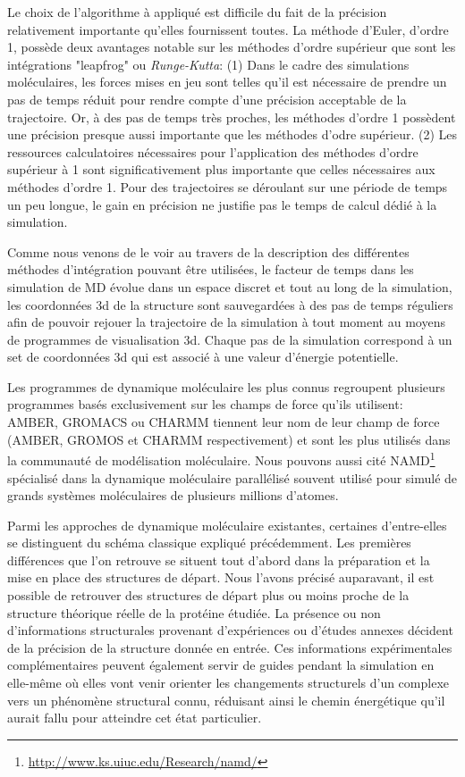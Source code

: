 Le choix de l'algorithme à appliqué est difficile du fait de la précision relativement importante qu'elles fournissent toutes. La méthode d'Euler, d'ordre 1, possède deux avantages notable sur les méthodes d'ordre supérieur que sont les intégrations "leapfrog" ou \textit{Runge-Kutta}: (1) Dans le cadre des simulations moléculaires, les forces mises en jeu sont telles qu'il est nécessaire de prendre un pas de temps réduit pour rendre compte d'une précision acceptable de la trajectoire. Or, à des pas de temps très proches, les méthodes d'ordre 1 possèdent une précision presque aussi importante que les méthodes d'odre supérieur. (2) Les ressources calculatoires nécessaires pour l'application des méthodes d'ordre supérieur à 1 sont significativement plus importante que celles nécessaires aux méthodes d'ordre 1. Pour des trajectoires se déroulant sur une période de temps un peu longue, le gain en précision ne justifie pas le temps de calcul dédié à la simulation.  

Comme nous venons de le voir au travers de la description des différentes méthodes d'intégration pouvant être utilisées, le facteur de temps dans les simulation de MD évolue dans un espace discret et tout au long de la simulation, les coordonnées 3d de la structure sont sauvegardées à des pas de temps réguliers afin de pouvoir rejouer la trajectoire de la simulation à tout moment au moyens de programmes de visualisation 3d. Chaque pas de la simulation correspond à un set de coordonnées 3d qui est associé à une valeur d'énergie potentielle.

Les programmes de dynamique moléculaire les plus connus regroupent plusieurs programmes basés exclusivement sur les champs de force qu'ils utilisent: AMBER, GROMACS ou CHARMM tiennent leur nom de leur champ de force (AMBER, GROMOS et CHARMM respectivement) et sont les plus utilisés dans la communauté de modélisation moléculaire. Nous pouvons aussi cité NAMD\footnote{\url{http://www.ks.uiuc.edu/Research/namd/}} \cite{phillips2005scalable} spécialisé dans la dynamique moléculaire parallélisé souvent utilisé pour simulé de grands systèmes moléculaires de plusieurs millions d'atomes.

Parmi les approches de dynamique moléculaire existantes, certaines d'entre-elles se distinguent du schéma classique expliqué précédemment.
Les premières différences que l'on retrouve se situent tout d'abord dans la préparation et la mise en place des structures de départ. Nous l'avons précisé auparavant, il est possible de retrouver des structures de départ plus ou moins proche de la structure théorique réelle de la protéine étudiée. La présence ou non d'informations structurales provenant d'expériences ou d'études annexes décident de la précision de la structure donnée en entrée.
Ces informations expérimentales complémentaires peuvent également servir de guides pendant la simulation en elle-même où elles vont venir orienter les changements structurels d'un complexe vers un phénomène structural connu, réduisant ainsi le chemin énergétique qu'il aurait fallu pour atteindre cet état particulier.

